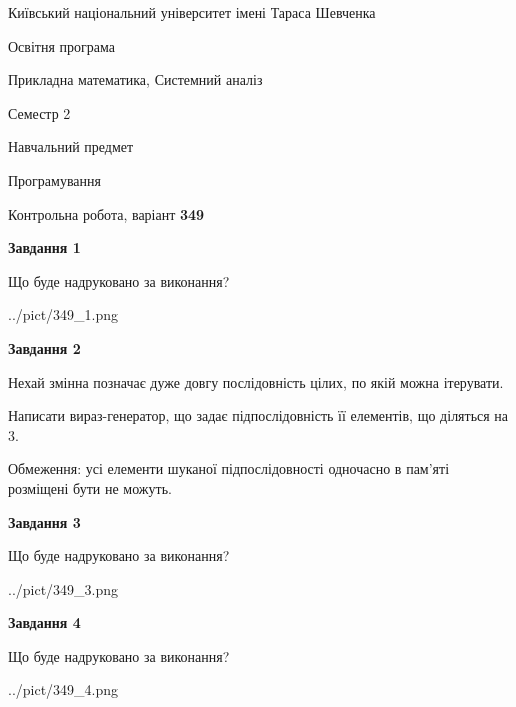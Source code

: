 \documentclass[12pt, ukrainian]{article}
\begin{document}
{{\begin {small}\par
{ \center  Київський національний університет імені Тараса Шевченка \par}
{\parbox {5 cm}{Освітня програма \hfill}{\parbox {8 cm}{Прикладна математика, Системний аналіз \hfill}}\parbox {5 cm}{\hfill Семестр 2}}\par
{\parbox {5 cm} {Навчальний предмет \hfill}\parbox {7 cm}{Програмування \hfill}\parbox {6cm}{\hfill}\par}\vspace{-7pt} \end{small}}{\center Контрольна робота, варіант  \No \textbf
{ 349 }\par}}
{
\begin {large}
{\begin {center}\textbf{Завдання 1}\end {center}}\par
Що буде надруковано за виконання?\par\par
\begin{center}
	{../pict/349_1.png}
\end{center}
\newpage

{\begin {center}\textbf{Завдання 2}\end {center}}\par
Нехай змінна  позначає дуже довгу послідовність цілих, по якій можна ітерувати.

Написати вираз-генератор, що задає підпослідовність її елементів, що діляться на 3.

Обмеження: усі елементи шуканої підпослідовності одночасно в пам'яті розміщені бути не можуть.\par
\newpage

{\begin {center}\textbf{Завдання 3}\end {center}}\par
Що буде надруковано за виконання?
\begin{center}
	{../pict/349_3.png}
\end{center}
\newpage

{\begin {center}\textbf{Завдання 4}\end {center}}\par
Що буде надруковано за виконання?\par
\begin{center}
	{../pict/349_4.png}
\end{center}
\newpage


\end{large}}
\end{document}
